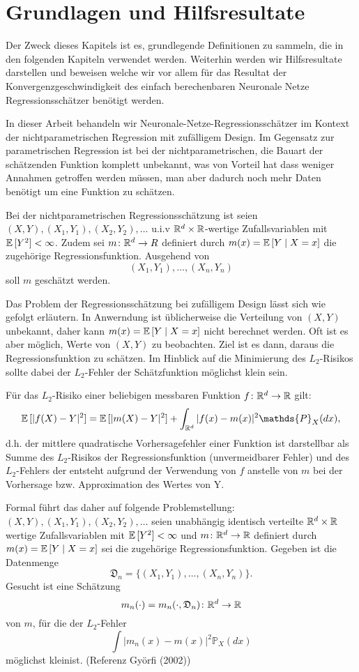 \chapter{Grundlagen und Hilfsresultate}
\label{chap:1}

Der Zweck dieses Kapitels ist es, grundlegende Definitionen zu sammeln, die in den folgenden Kapiteln verwendet werden. Weiterhin werden wir Hilfsresultate darstellen und beweisen welche wir vor allem für das Resultat der Konvergenzgeschwindigkeit des einfach berechenbaren Neuronale Netze Regressionsschätzer benötigt werden.

In dieser Arbeit behandeln wir Neuronale-Netze-Regressionsschätzer im Kontext der nichtparametrischen Regression mit zufälligem Design. Im Gegensatz zur parametrischen Regression ist bei der nichtparametrischen, die Bauart der schätzenden Funktion komplett unbekannt, was von Vorteil hat dass weniger Annahmen getroffen werden müssen, man aber dadurch noch mehr Daten benötigt um eine Funktion zu schätzen.

Bei der nichtparametrischen Regressionsschätzung ist seien $(X, Y), (X_1, Y_1), (X_2, Y_2), \dots$ u.i.v $\mathbb{R}^d \times \mathbb{R}$-wertige Zufallsvariablen mit $\mathbb{E}\,[Y^2] < \infty$. Zudem sei $m\colon \mathbb{R}^d \to R$ definiert durch $m(x) = \mathbb{E}\,[Y \mid X = x]$ die zugehörige Regressionsfunktion. Ausgehend von 
$$ (X_1, Y_1),\dots,(X_n, Y_n)$$ 
soll $m$ geschätzt werden.

Das Problem der Regressionsschätzung bei zufälligem Design lässt sich wie gefolgt erläutern. In Anwerndung ist üblicherweise die Verteilung von $(X, Y)$ unbekannt, daher kann $m(x) = \mathbb{E}\,[Y \mid X = x]$ nicht berechnet werden. Oft ist es aber möglich, Werte von $(X, Y)$ zu beobachten. Ziel ist es dann, daraus die Regressionsfunktion zu schätzen. Im Hinblick auf die Minimierung des $L_2$-Risikos sollte dabei der $L_2$-Fehler der Schätzfunktion möglichst klein sein. 

Für das $L_2$-Risiko einer beliebigen messbaren Funktion $f\colon \mathbb{R}^d \to \mathbb{R}$  gilt$\colon$
$$\E[|f(X) - Y|^2] = \E[|m(X) - Y|^2] + \int_{\R^d}|f(x) - m(x)|^2 \mathds{P}_X (dx),$$
d.h. der mittlere quadratische Vorhersagefehler einer Funktion ist darstellbar als Summe des $L_2$-Risikos der Regressionsfunktion (unvermeidbarer Fehler) und des $L_2$-Fehlers der entsteht aufgrund der Verwendung von $f$ anstelle von $m$ bei der Vorhersage bzw. Approximation des Wertes von Y.

Formal führt das daher auf folgende Problemstellung$\colon$
$(X, Y), (X_1, Y_1), (X_2, Y_2), \dots$ seien unabhängig identisch verteilte $\mathbb{R}^d \times \mathbb{R}$ wertige Zufallsvariablen mit $\mathbb{E}\,[Y^2] < \infty$ und $m\colon\mathbb{R}^d \to \mathbb{R}$ definiert durch $m(x) = \mathbb{E}\,[Y \mid X = x]$ sei die zugehörige Regressionsfunktion. Gegeben ist die Datenmenge 
$$ \mathfrak{D}_n = \{(X_1, Y_1),\dots,(X_n, Y_n)\}.$$
Gesucht ist eine Schätzung 
$$m_n(\cdot) = m_n(\cdot, \mathfrak{D}_n)\colon\mathbb{R}^d \to \mathbb{R} $$
von $m$, für die der $L_2$-Fehler 
$$\int |m_n(x) - m(x)|^2 \mathds{P}_X(dx)$$
möglichst \glqq klein\grqq ist. (Referenz Györfi (2002))

